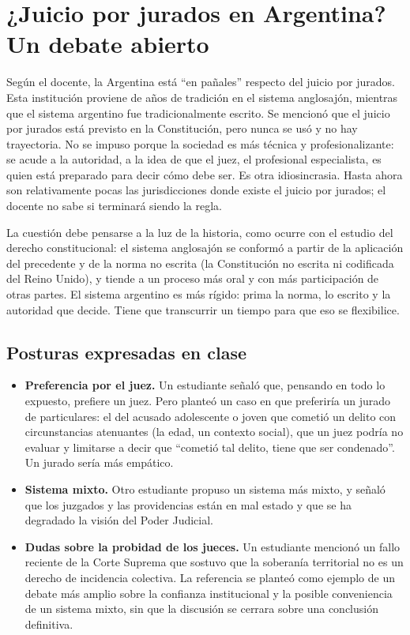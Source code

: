 \documentclass[12pt,oneside]{book}
\begin{document}
\section{¿Juicio por jurados en Argentina? Un debate abierto}

Según el docente, la Argentina está ``en pañales'' respecto del juicio por jurados. Esta institución proviene de años de tradición en el sistema anglosajón, mientras que el sistema argentino fue tradicionalmente escrito. Se mencionó que el juicio por jurados está previsto en la Constitución, pero nunca se usó y no hay trayectoria. No se impuso porque la sociedad es más técnica y profesionalizante: se acude a la autoridad, a la idea de que el juez, el profesional especialista, es quien está preparado para decir cómo debe ser. Es otra idiosincrasia. Hasta ahora son relativamente pocas las jurisdicciones donde existe el juicio por jurados; el docente no sabe si terminará siendo la regla.

La cuestión debe pensarse a la luz de la historia, como ocurre con el estudio del derecho constitucional: el sistema anglosajón se conformó a partir de la aplicación del precedente y de la norma no escrita (la Constitución no escrita ni codificada del Reino Unido), y tiende a un proceso más oral y con más participación de otras partes. El sistema argentino es más rígido: prima la norma, lo escrito y la autoridad que decide. Tiene que transcurrir un tiempo para que eso se flexibilice.

\subsection{Posturas expresadas en clase}

\begin{itemize}
\item \textbf{Preferencia por el juez.} Un estudiante señaló que, pensando en todo lo expuesto, prefiere un juez. Pero planteó un caso en que preferiría un jurado de particulares: el del acusado adolescente o joven que cometió un delito con circunstancias atenuantes (la edad, un contexto social), que un juez podría no evaluar y limitarse a decir que ``cometió tal delito, tiene que ser condenado''. Un jurado sería más empático.
\item \textbf{Sistema mixto.} Otro estudiante propuso un sistema más mixto, y señaló que los juzgados y las providencias están en mal estado y que se ha degradado la visión del Poder Judicial.
\item \textbf{Dudas sobre la probidad de los jueces.} Un estudiante mencionó un fallo reciente de la Corte Suprema que sostuvo que la soberanía territorial no es un derecho de incidencia colectiva. La referencia se planteó como ejemplo de un debate más amplio sobre la confianza institucional y la posible conveniencia de un sistema mixto, sin que la discusión se cerrara sobre una conclusión definitiva.
\end{itemize}
\end{document}
